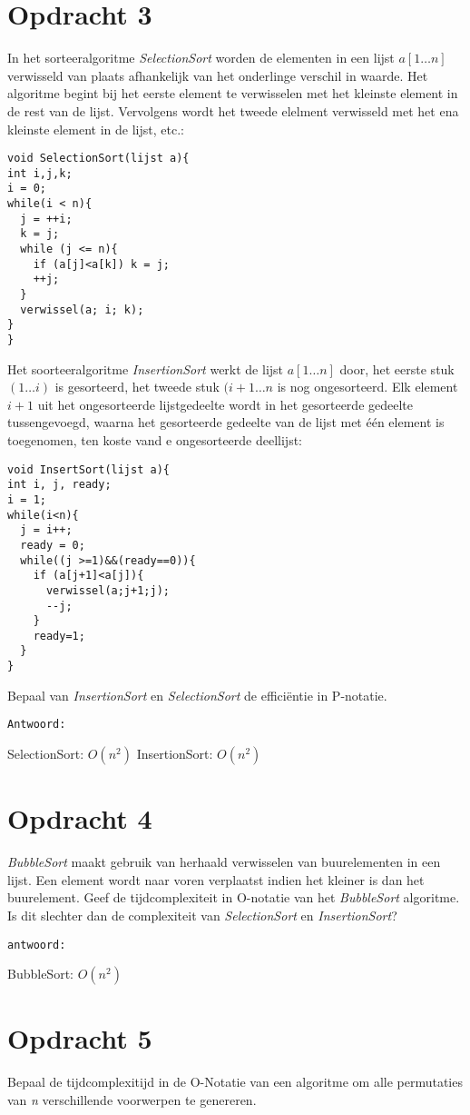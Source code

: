 \section{Opdracht 3}
In het sorteeralgoritme \emph{SelectionSort} worden de elementen in een lijst $a[1\ldots{}n]$ verwisseld van plaats afhankelijk van het onderlinge verschil in waarde. Het algoritme begint bij het eerste element te verwisselen met het kleinste element in de rest van de lijst. Vervolgens wordt het tweede elelment verwisseld met het ena kleinste element in de lijst, etc.:
\begin{lstlisting}
void SelectionSort(lijst a){
int i,j,k;
i = 0;
while(i < n){
  j = ++i;
  k = j;
  while (j <= n){
    if (a[j]<a[k]) k = j;
    ++j;
  }
  verwissel(a; i; k);
}
}
\end{lstlisting}
Het soorteeralgoritme \emph{InsertionSort} werkt de lijst $a[1\ldots n]$ door, het eerste stuk $(1\ldots i)$ is gesorteerd, het tweede stuk $(i+1\ldots n$ is nog ongesorteerd.
 Elk element $i+1$ uit het ongesorteerde lijstgedeelte wordt in het gesorteerde gedeelte tussengevoegd, waarna het gesorteerde gedeelte van de lijst met \'{e}\'{e}n element is toegenomen, ten koste vand e ongesorteerde deellijst:
\begin{lstlisting}
void InsertSort(lijst a){
int i, j, ready;
i = 1;
while(i<n){
  j = i++;
  ready = 0;
  while((j >=1)&&(ready==0)){
    if (a[j+1]<a[j]){
      verwissel(a;j+1;j);
      --j;
    }
    ready=1;
  }
}
\end{lstlisting}
Bepaal van \emph{InsertionSort} en \emph{SelectionSort} de effici\"{e}ntie in P-notatie.

\texttt{Antwoord:}

SelectionSort: $O(n^2)$
InsertionSort: $O(n^2)$

\section{Opdracht 4}
\emph{BubbleSort} maakt gebruik van herhaald verwisselen van buurelementen in een lijst. Een element wordt naar voren verplaatst indien het kleiner is dan het buurelement. Geef de tijdcomplexiteit in O-notatie van het \emph{BubbleSort} algoritme. Is dit slechter dan de complexiteit van \emph{SelectionSort} en \emph{InsertionSort}?

\texttt{antwoord:}

BubbleSort: $O(n^2)$

\section{Opdracht 5}
Bepaal de tijdcomplexitijd in de O-Notatie van een algoritme om alle permutaties van \emph{n} verschillende voorwerpen te genereren.

